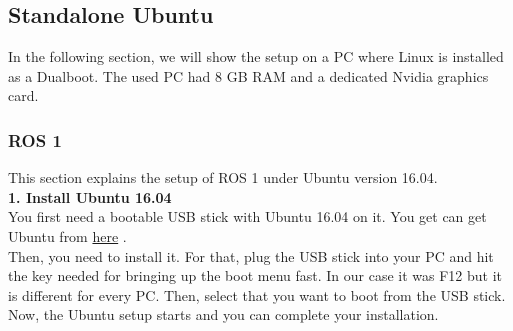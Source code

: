 \documentclass[plainarticle,zihtitle,english,final,hyperref,utf8]{zihpub}
\begin{document}
\begin{table}[h!]

\caption{Possible Setups of the TurtleBot3 Simulation Environments}
\label{tab:possible setups}
\end{table}

\subsection{Standalone Ubuntu}
\label{sec:standalone-ubuntu}
In the following section, we will show the setup on a PC where Linux is installed as a Dualboot. The used PC had 8 GB RAM and a dedicated Nvidia graphics card.\\
\subsubsection{ROS 1}
This section explains the setup of ROS 1 under Ubuntu version 16.04.\\
\newline
\textbf{1. Install Ubuntu 16.04}\\
\newline
You first need a bootable USB stick with Ubuntu 16.04 on it. You get can get Ubuntu from \href{https://releases.ubuntu.com/16.04/}{here} \cite{ubuntu16}.\\
Then, you need to install it. For that, plug the USB stick into your PC and hit the key needed for bringing up the boot menu fast. In our case it was F12 but it is different for every PC. Then, select that you want to boot from the USB stick. Now, the Ubuntu setup starts and you can complete your installation.\\
\newline
\end{document}
